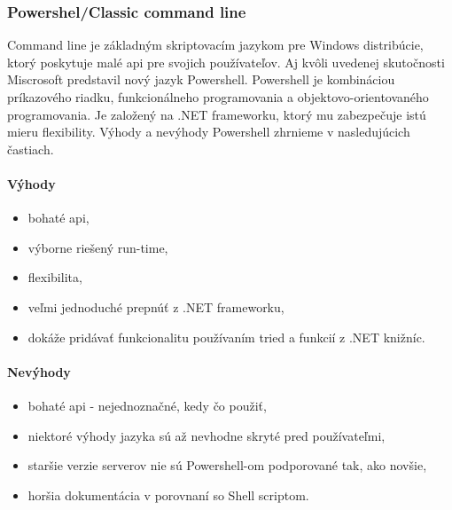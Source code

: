 \newpage

\subsubsection{Powershel/Classic command line}
\indent  
Command line je základným skriptovacím jazykom pre Windows distribúcie, ktorý poskytuje malé \acrshort{api} pre svojich používateľov. Aj kvôli uvedenej skutočnosti Miscrosoft predstavil nový jazyk Powershell. Powershell je kombináciou príkazového riadku, funkcionálneho programovania a objektovo-orientovaného programovania. Je založený na .NET frameworku, ktorý mu zabezpečuje istú mieru flexibility. 
Výhody a nevýhody Powershell zhrnieme v nasledujúcich častiach.

\paragraph{Výhody}
\begin{itemize}
	\item bohaté \acrshort{api},
	\item výborne riešený run-time,
	\item flexibilita,
	\item veľmi jednoduché prepnúť z .NET frameworku,
	\item dokáže pridávať funkcionalitu používaním tried a funkcií z .NET knižníc.
	\newline 
\end{itemize}
\paragraph{Nevýhody}
\begin{itemize}
	\item bohaté \acrshort{api} - nejednoznačné, kedy čo použiť,
	\item niektoré výhody jazyka sú až nevhodne skryté pred používateľmi,
	\item staršie verzie serverov nie sú Powershell-om podporované tak, ako novšie,
	\item horšia dokumentácia v porovnaní so Shell scriptom.
	\newline
\end{itemize}

